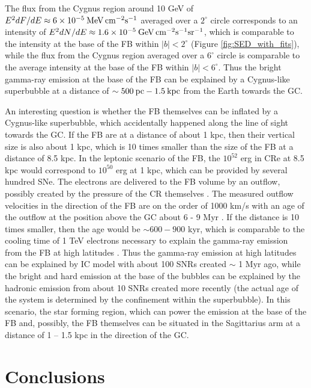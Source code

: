 The flux from the Cygnus region around 10 GeV of 
$E^2 {dF}/{dE} \approx 6\times 10^{-5}\: {\rm MeV\, cm^{-2} s^{-1}}$
averaged over a $2^\circ$ circle
corresponds to an intensity of $E^2 {dN}/{dE} \approx 1.6\times 10^{-5}\: {\rm GeV\, cm^{-2} s^{-1}sr^{-1}}$,
which is comparable to the intensity at the base of the FB within $|b| < 2^\circ$ (Figure \ref{fig:SED_with_fits}),
while the flux from the Cygnus region averaged over a $6^\circ$ circle is comparable to the average intensity
at the base of the FB within $|b| < 6^\circ$.
Thus the bright gamma-ray emission at the base of the FB can be explained by a Cygnus-like 
superbubble at a distance of $\sim 500\:{\rm pc} - 1.5 \:{\rm kpc}$ from the Earth towards the GC.

An interesting question is whether the FB themselves can be inflated by a Cygnus-like superbubble,
which accidentally happened along the line of sight towards the GC.
If the FB are at a distance of about 1 kpc, then their vertical size is also about 1 kpc,
which is 10 times smaller than the size of the FB at a distance of 8.5 kpc.
In the leptonic scenario of the FB, the $10^{52}$ erg in CRe at 8.5 kpc \citep{2014ApJ...793...64A}
would correspond to $10^{50}$ erg at 1 kpc, which can be provided by several hundred SNe.
The electrons are delivered to the FB volume by an outflow,
possibly created by the pressure of the CR themselves \citep[e.g.,][]{2018MNRAS.475..570J}.
The measured outflow velocities in the direction of the FB are on the order of 1000 km/s
with an age of the outflow at the position above the GC about 6 - 9 Myr \citep{2015ApJ...799L...7F, 2017ApJ...834..191B}.
If the distance is 10 times smaller, then the age would be $\sim 600 - 900$ kyr,
which is comparable to the cooling time of 1 TeV electrons necessary to explain the 
gamma-ray emission from the FB at high latitudes \citep{2014ApJ...793...64A}.
Thus the gamma-ray emission at high latitudes can be explained by IC model with about 100 SNRs
created $\sim$ 1 Myr ago, while the bright and hard emission at the base of the bubbles can
be explained by the hadronic emission from about 10 SNRs created more recently 
(the actual age of the system is determined by the confinement within the superbubble).
In this scenario,
the star forming region, which can power the emission at the base of the FB and, possibly, the FB themselves
can be situated in the Sagittarius arm at a distance of 1 -- 1.5 kpc in the direction of the GC.


\section{Conclusions}

